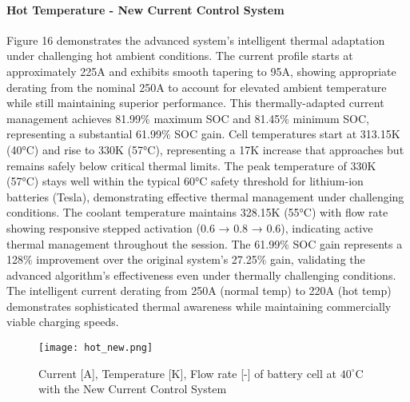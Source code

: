 \documentclass[conference]{IEEEtran}
\begin{document}
\paragraph{\textbf{Hot Temperature - New Current Control System}}
Figure 16 demonstrates the advanced system's intelligent thermal adaptation under challenging hot ambient conditions. The current profile starts at approximately 225A and exhibits smooth tapering to 95A, showing appropriate derating from the nominal 250A to account for elevated ambient temperature while still maintaining superior performance. This thermally-adapted current management achieves 81.99$\%$ maximum SOC and 81.45$\%$ minimum SOC, representing a substantial 61.99$\%$ SOC gain.
Cell temperatures start at 313.15K (40°C) and rise to 330K (57°C), representing a 17K increase that approaches but remains safely below critical thermal limits. The peak temperature of 330K (57°C) stays well within the typical 60°C safety threshold for lithium-ion batteries (Tesla), demonstrating effective thermal management under challenging conditions. The coolant temperature maintains 328.15K (55°C) with flow rate showing responsive stepped activation (0.6 → 0.8 → 0.6), indicating active thermal management throughout the session.
The 61.99$\%$ SOC gain represents a 128$\%$ improvement over the original system's 27.25$\%$ gain, validating the advanced algorithm's effectiveness even under thermally challenging conditions. The intelligent current derating from 250A (normal temp) to 220A (hot temp) demonstrates sophisticated thermal awareness while maintaining commercially viable charging speeds.


\begin{figure}[H]
    \centering
    \texttt{[image: hot\_new.png]}
    \caption{Current [A], Temperature [K], Flow rate [-] of battery cell at $40^\circ$C with the New Current Control System }
    \label{fig:enter-label}
\end{figure}
\end{document}
